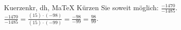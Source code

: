 \begin{MAufgabe}{Kuerzen}{kr, dh, MaTeX}
K\"urzen Sie soweit m\"oglich: $\frac{-1470}{-1485}$.\\ 
\ifLsg\MLoesung
\quad $\frac{-1470}{-1485}=\frac{(15)\cdot(-98)}{(15)\cdot(-99)}=\frac{-98}{-99}=\frac{98}{99}$.\else\relax\fi
 \end{MAufgabe}